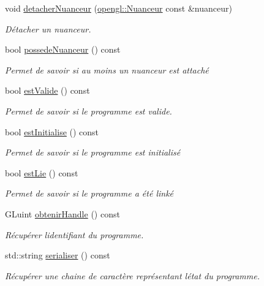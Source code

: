 \begin{DoxyCompactItemize}
void \hyperlink{classopengl_1_1_programme_a7d669afa49539b140eb440f80be3769a}{detacher\+Nuanceur} (\hyperlink{classopengl_1_1_nuanceur}{opengl\+::\+Nuanceur} const \&nuanceur)
\begin{DoxyCompactList}\small\item\em Détacher un nuanceur. \end{DoxyCompactList}\item 
bool \hyperlink{classopengl_1_1_programme_a15b37f43e795441a8ce4d9f035677677}{possede\+Nuanceur} () const 
\begin{DoxyCompactList}\small\item\em Permet de savoir si au moins un nuanceur est attaché \end{DoxyCompactList}\item 
bool \hyperlink{classopengl_1_1_programme_ae9485ed8c8a0e651a1d020f88bca0418}{est\+Valide} () const 
\begin{DoxyCompactList}\small\item\em Permet de savoir si le programme est valide. \end{DoxyCompactList}\item 
bool \hyperlink{classopengl_1_1_programme_aeba7bf4c54047bc60f334c9fd78368ff}{est\+Initialise} () const 
\begin{DoxyCompactList}\small\item\em Permet de savoir si le programme est initialisé \end{DoxyCompactList}\item 
bool \hyperlink{classopengl_1_1_programme_a8cd0cd3ad4bf0608d5a7fddd505ac488}{est\+Lie} () const 
\begin{DoxyCompactList}\small\item\em Permet de savoir si le programme a été linké \end{DoxyCompactList}\item 
G\+Luint \hyperlink{classopengl_1_1_programme_a871dc46d4531af9787b68edebb24ea37}{obtenir\+Handle} () const 
\begin{DoxyCompactList}\small\item\em Récupérer l\textquotesingle{}identifiant du programme. \end{DoxyCompactList}\item 
std\+::string \hyperlink{classopengl_1_1_programme_a7543f836defd652c0abd14aa8ce67c5b}{serialiser} () const 
\begin{DoxyCompactList}\small\item\em Récupérer une chaine de caractère représentant l\textquotesingle{}état du programme. \end{DoxyCompactList}\item 

\end{DoxyCompactItemize}

